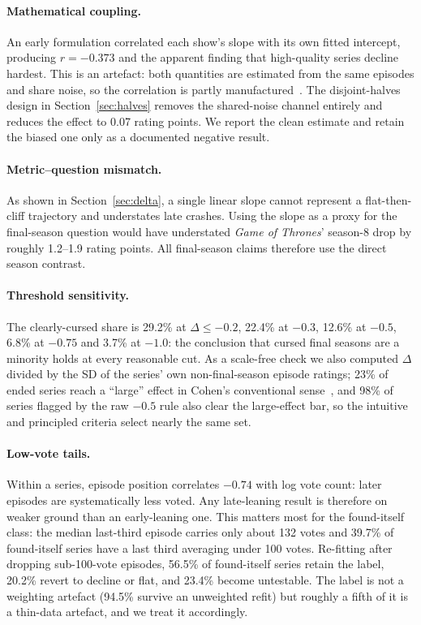 \documentclass[11pt,a4paper]{article}
\begin{document}
\paragraph{Mathematical coupling.}
An early formulation correlated each show's slope with its own fitted
intercept, producing $r = -0.373$ and the apparent finding that high-quality
series decline hardest. This is an artefact: both quantities are estimated from
the same episodes and share noise, so the correlation is partly
manufactured~\cite{barnett}. The disjoint-halves design in
Section~\ref{sec:halves} removes the shared-noise channel entirely and reduces
the effect to 0.07 rating points. We report the clean estimate and retain the
biased one only as a documented negative result.

\paragraph{Metric--question mismatch.}
As shown in Section~\ref{sec:delta}, a single linear slope cannot represent a
flat-then-cliff trajectory and understates late crashes. Using the slope as a
proxy for the final-season question would have understated \emph{Game of
Thrones}' season-8 drop by roughly 1.2--1.9 rating points. All final-season
claims therefore use the direct season contrast.

\paragraph{Threshold sensitivity.}
\label{sec:thresh}
The clearly-cursed share is 29.2\% at $\Delta \le -0.2$, 22.4\% at $-0.3$,
12.6\% at $-0.5$, 6.8\% at $-0.75$ and 3.7\% at $-1.0$: the conclusion that
cursed final seasons are a minority holds at every reasonable cut. As a
scale-free check we also computed $\Delta$ divided by the SD of the series' own
non-final-season episode ratings; 23\% of ended series reach a ``large'' effect
in Cohen's conventional sense~\cite{cohen}, and 98\% of series flagged by the
raw $-0.5$ rule also clear the large-effect bar, so the intuitive and
principled criteria select nearly the same set.

\paragraph{Low-vote tails.}
Within a series, episode position correlates $-0.74$ with log vote count: later
episodes are systematically less voted. Any late-leaning result is therefore on
weaker ground than an early-leaning one. This matters most for the found-itself
class: the median last-third episode carries only about 132 votes and 39.7\% of
found-itself series have a last third averaging under 100 votes. Re-fitting
after dropping sub-100-vote episodes, 56.5\% of found-itself series retain the
label, 20.2\% revert to decline or flat, and 23.4\% become untestable. The
label is not a weighting artefact (94.5\% survive an unweighted refit) but
roughly a fifth of it is a thin-data artefact, and we treat it accordingly.
\end{document}
